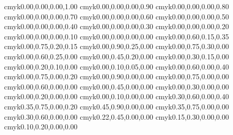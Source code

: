 %
%
%
%
\definecolor{black}               {cmyk}{0.00,0.00,0.00,1.00}
\definecolor{verydeepgrey}        {cmyk}{0.00,0.00,0.00,0.90}
\definecolor{deepgrey}            {cmyk}{0.00,0.00,0.00,0.80}
\definecolor{verydarkgrey}        {cmyk}{0.00,0.00,0.00,0.70}
\definecolor{darkgrey}            {cmyk}{0.00,0.00,0.00,0.60}
\definecolor{grey}                {cmyk}{0.00,0.00,0.00,0.50}
\definecolor{lightgrey}           {cmyk}{0.00,0.00,0.00,0.40}
\definecolor{verylightgrey}       {cmyk}{0.00,0.00,0.00,0.30}
\definecolor{palegrey}            {cmyk}{0.00,0.00,0.00,0.20}
\definecolor{verypalegrey}        {cmyk}{0.00,0.00,0.00,0.10}
\definecolor{white}               {cmyk}{0.00,0.00,0.00,0.00}
\definecolor{verydeeppink}        {cmyk}{0.00,0.60,0.15,0.35}
\definecolor{deeppink}            {cmyk}{0.00,0.75,0.20,0.15}
\definecolor{verydarkpink}        {cmyk}{0.00,0.90,0.25,0.00}
\definecolor{darkpink}            {cmyk}{0.00,0.75,0.30,0.00}
\definecolor{pink}                {cmyk}{0.00,0.60,0.25,0.00}
\definecolor{lightpink}           {cmyk}{0.00,0.45,0.20,0.00}
\definecolor{verylightpink}       {cmyk}{0.00,0.30,0.15,0.00}
\definecolor{palepink}            {cmyk}{0.00,0.20,0.10,0.00}
\definecolor{verypalepink}        {cmyk}{0.00,0.10,0.05,0.00}
\definecolor{verydeepmagenta}     {cmyk}{0.00,0.60,0.00,0.40}
\definecolor{deepmagenta}         {cmyk}{0.00,0.75,0.00,0.20}
\definecolor{verydarkmagenta}     {cmyk}{0.00,0.90,0.00,0.00}
\definecolor{darkmagenta}         {cmyk}{0.00,0.75,0.00,0.00}
\definecolor{magenta}             {cmyk}{0.00,0.60,0.00,0.00}
\definecolor{lightmagenta}        {cmyk}{0.00,0.45,0.00,0.00}
\definecolor{verylightmagenta}    {cmyk}{0.00,0.30,0.00,0.00}
\definecolor{palemagenta}         {cmyk}{0.00,0.20,0.00,0.00}
\definecolor{verypalemagenta}     {cmyk}{0.00,0.10,0.00,0.00}
\definecolor{verydeepviolet}      {cmyk}{0.30,0.60,0.00,0.40}
\definecolor{deepviolet}          {cmyk}{0.35,0.75,0.00,0.20}
\definecolor{verydarkviolet}      {cmyk}{0.45,0.90,0.00,0.00}
\definecolor{darkviolet}          {cmyk}{0.35,0.75,0.00,0.00}
\definecolor{violet}              {cmyk}{0.30,0.60,0.00,0.00}
\definecolor{lightviolet}         {cmyk}{0.22,0.45,0.00,0.00}
\definecolor{verylightviolet}     {cmyk}{0.15,0.30,0.00,0.00}
\definecolor{paleviolet}          {cmyk}{0.10,0.20,0.00,0.00}
